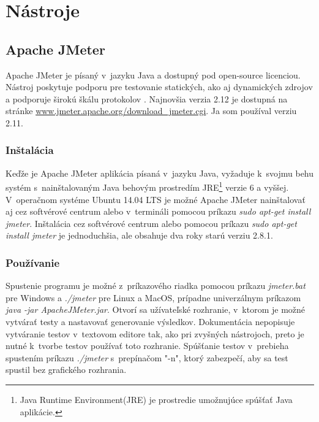 \documentclass[12pt,oneside,final]{fithesis-utf8}
\begin{document}
\chapter{Nástroje}

\section{Apache JMeter}
Apache JMeter je písaný v~jazyku Java a dostupný pod open-source licenciou. Nástroj poskytuje podporu pre testovanie statických, ako aj dynamických zdrojov a podporuje širokú škálu protokolov \cite{Apache}. Najnovšia verzia 2.12 je dostupná na stránke \url{www.jmeter.apache.org/download_jmeter.cgi}. Ja som používal verziu 2.11.

\subsection{Inštalácia}
Keďže je Apache JMeter aplikácia písaná v~jazyku Java, vyžaduje k~svojmu behu systém s~nainštalovaným Java behovým prostredím JRE\footnote{Java Runtime Environment(JRE) je prostredie umožnujúce spúšťať Java aplikácie.} verzie 6 a vyššej. V~operačnom systéme Ubuntu 14.04 LTS je možné Apache JMeter nainštalovať aj cez softvérové centrum alebo v~termináli pomocou príkazu \textit{sudo apt-get install jmeter}. Inštalácia cez softvérové centrum alebo pomocou príkazu \textit{sudo apt-get install jmeter} je jednoduchšia, ale obsahuje dva roky starú verziu 2.8.1. 

\subsection{Používanie}
Spustenie programu je možné z~príkazového riadka pomocou príkazu \textit{jmeter.bat} pre Windows a \textit{./jmeter} pre Linux a MacOS, prípadne univerzálnym príkazom \textit{java -jar ApacheJMeter.jar}. Otvorí sa užívateľské rozhranie, v~ktorom je možné vytvárať testy a nastavovať generovanie výsledkov. Dokumentácia nepopisuje vytváranie testov v~textovom editore tak, ako pri zvyšných nástrojoch, preto je nutné k~tvorbe testov používať toto rozhranie. Spúšťanie testov v~prebieha spustením  príkazu \textit{./jmeter} s~prepínačom "{}-n"{}, ktorý zabezpečí, aby sa test spustil bez grafického rozhrania.
\end{document}
